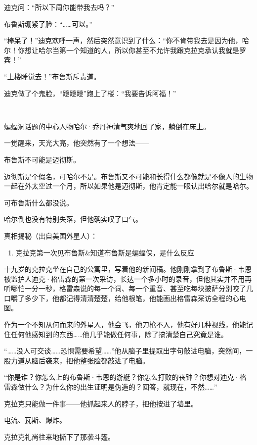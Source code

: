 \documentclass[../main]{subfiles}
\begin{document}
迪克问：“所以下周你能带我去吗？”

布鲁斯绷紧了脸：“……可以。”

“棒呆了！”迪克欢呼一声，然后突然意识到了什么：“你不肯带我去是因为他，哈尔！你想让哈尔当第一个知道的人，所以你甚至不允许我跟克拉克承认我就是罗宾！”

“上楼睡觉去！”布鲁斯斥责道。

迪克做了个鬼脸，“蹬蹬蹬”跑上了楼：“我要告诉阿福！”

~\

蝙蝠洞话题的中心人物哈尔·乔丹神清气爽地回了家，躺倒在床上。

一觉醒来，天光大亮，他突然有了一个想法——

布鲁斯不可能是迈彻斯。

迈彻斯是个假名，可哈尔不是。布鲁斯又不可能和长得什么都像就是不像人的生物一起在外太空过一个月，所以如果他是迈彻斯，他肯定能一眼认出哈尔就是哈尔。

可布鲁斯什么都没说。

哈尔倒也没有特别失落，但他确实叹了口气。

\horline

真相揭秘（出自美国外星人）：

\begin{enumerate}
    \def\labelenumi{\arabic{enumi}.}
    \item
          克拉克第一次见布鲁斯\&知道布鲁斯是蝙蝠侠，是什么反应
\end{enumerate}

十九岁的克拉克坐在自己的公寓里，写着他的新闻稿。他刚刚拿到了布鲁斯·韦恩被监护人迪克·格雷森的第一次采访，长达一个多小时的录音，但他其实并不用再听哪怕一分一秒，格雷森说的每一个词、每一个重音、甚至吃每块披萨分别咬了几口嚼了多少下，他都记得清清楚楚，给他根笔，他能画出格雷森采访全程的心电图。

作为一个不知从何而来的外星人，他会飞，他刀枪不入，他有好几种视线，他能记住任何他感知到的东西……他几乎能做任何事，除了搞清楚自己究竟是谁。

“……没人可交谈……恐惧需要希望……”他从脑子里提取出字句敲进电脑，突然间，一股力道从脑后袭来，把他整张脸都敲进了电脑。

“你是谁？你怎么上的布鲁斯·韦恩的游艇？你怎么打败的丧钟？你想对迪克·格雷森做什么？为什么你的出生证明是伪造的？回答，就现在，不然……”

克拉克只能做一件事——他抓起来人的脖子，把他按进了墙里。

电流、瓦斯、爆炸。

克拉克礼尚往来地撕下了那袭斗篷。
\end{document}

